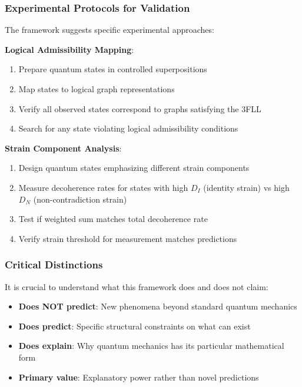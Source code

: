 \documentclass[12pt,a4paper]{article}
\begin{document}
\subsubsection{Experimental Protocols for Validation}

The framework suggests specific experimental approaches:

\textbf{Logical Admissibility Mapping}:
\begin{enumerate}
\item Prepare quantum states in controlled superpositions
\item Map states to logical graph representations
\item Verify all observed states correspond to graphs satisfying the 3FLL
\item Search for any state violating logical admissibility conditions
\end{enumerate}

\textbf{Strain Component Analysis}:
\begin{enumerate}
\item Design quantum states emphasizing different strain components
\item Measure decoherence rates for states with high $D_I$ (identity strain) vs high $D_N$ (non-contradiction strain)
\item Test if weighted sum matches total decoherence rate
\item Verify strain threshold for measurement matches predictions
\end{enumerate}

\subsubsection{Critical Distinctions}

It is crucial to understand what this framework does and does not claim:

\begin{itemize}
\item \textbf{Does NOT predict}: New phenomena beyond standard quantum mechanics
\item \textbf{Does predict}: Specific structural constraints on what can exist
\item \textbf{Does explain}: Why quantum mechanics has its particular mathematical form
\item \textbf{Primary value}: Explanatory power rather than novel predictions
\end{itemize}
\end{document}

